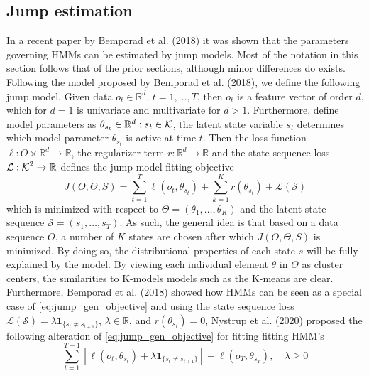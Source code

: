 \subsection{Jump estimation}
\label{subsection: Jump theory}
In a recent paper by Bemporad et al. (2018) it was shown that the parameters governing HMMs can be estimated by jump models. Most of the notation in this section follows that of the prior sections, although minor differences do exists. Following the model proposed by Bemporad et al. (2018), we define the following jump model. Given data $o_t\in \mathbb{R}^d$, $t=1,\ldots,T$, then $o_t$ is a feature vector of order $d$, which for $d=1$ is univariate and multivariate for $d>1$. Furthermore, define model parameters as $\theta_{s_t}\in \mathbb{R}^d:s_t\in\operatorname{\mathcal{K}}$, the latent state variable $s_t$ determines which model parameter $\theta_{s_t}$ is active at time $t$. Then the loss function $\ell: O\times\mathbb{R}^d \rightarrow\mathbb{R}$, the regularizer term $r: \mathbb{R}^d \rightarrow \mathbb{R}$ and the state sequence loss $\mathcal{L}:\operatorname{\mathcal{K}}^2 \rightarrow \mathbb{R}$ defines the jump model fitting objective
\begin{equation}
    J(O, \Theta, S) = \sum_{t=1}^T \ell(o_t,\theta_{s_t}) + \sum_{k=1}^K r(\theta_{s_t}) + \mathcal{L(S)}
\label{eq:jump_gen_objective}    
\end{equation}
which is minimized with respect to $\Theta=(\theta_1,\ldots,\theta_K)$ and the latent state sequence $\mathcal{S}=(s_1,\ldots,s_T)$. As such, the general idea is that based on a data sequence $O$, a number of $K$ states are chosen after which $J(O, \Theta, S)$ is minimized. By doing so, the distributional properties of each state $s$ will be fully explained by the model. By viewing each individual element $\theta$ in $\Theta$ as cluster centers, the similarities to K-models models such as the K-means are clear. Furthermore, Bemporad et al. (2018) showed how HMMs can be seen as a special case of \cref{eq:jump_gen_objective} and using the state sequence loss $\mathcal{L(S)} = \lambda\mathbf{1}_{\{ s_t\ne s_{t+1}\}}$, $\lambda \in \mathbb{R}$, and $r(\theta_{s_t})=0$, Nystrup et al. (2020) proposed the following alteration of \cref{eq:jump_gen_objective} for fitting fitting HMM's
\begin{equation}
    \sum_{t=1}^{T-1}[\ell(o_t, \theta_{s_t}) + \lambda\mathbf{1}_{\{ s_t\ne s_{t+1} \}}]
    + \ell(o_T, \theta_{s_T})
    ,\quad \lambda \geq 0
\label{eq:jump_objective}
\end{equation}

